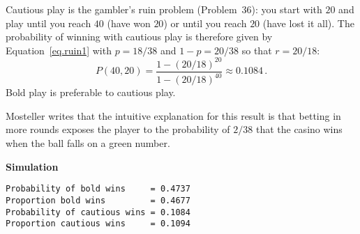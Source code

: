 Cautious play is the gambler's ruin problem (Problem~36): you start with $20$ and play until you reach $40$ (have won $20$) or until you reach $20$ (have lost it all). The probability of winning with cautious play is therefore given by Equation~\ref{eq.ruin1} with $p=18/38$ and $1-p=20/38$ so that $r=20/18$:
\[
P(40,20) =
\frac{1-(20/18)^{20}}{1-(20/18)^{40}}\approx 0.1084\,.
\]
Bold play is preferable to cautious play.

Mosteller writes that the intuitive explanation for this result is that betting in more rounds exposes the player to the probability of $2/38$ that the casino wins when the ball falls on a green number.

\textbf{Simulation}
\begin{verbatim}
Probability of bold wins     = 0.4737
Proportion bold wins         = 0.4677
Probability of cautious wins = 0.1084
Proportion cautious wins     = 0.1094
\end{verbatim}




